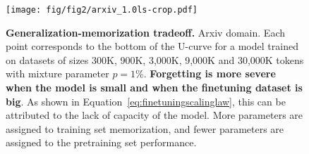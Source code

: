 \begin{figure}[t]
    \centering
    \texttt{[image: fig/fig2/arxiv\_1.0ls-crop.pdf]}
    \caption{\textbf{Generalization-memorization tradeoff.} Arxiv domain. Each point corresponds to the bottom of the U-curve for a model trained on datasets of sizes 300K, 900K, 3,000K, 9,000K and 30,000K tokens with mixture parameter $p=1\%$. \textbf{Forgetting is more severe when the model is small and when the finetuning dataset is big}. As shown in Equation~\ref{eq:finetuningscalinglaw}, this can be attributed to the lack of capacity of the model. More parameters are assigned to training set memorization, and fewer parameters are assigned to the pretraining set performance.}
    \label{fig:paretoplot}
\end{figure}